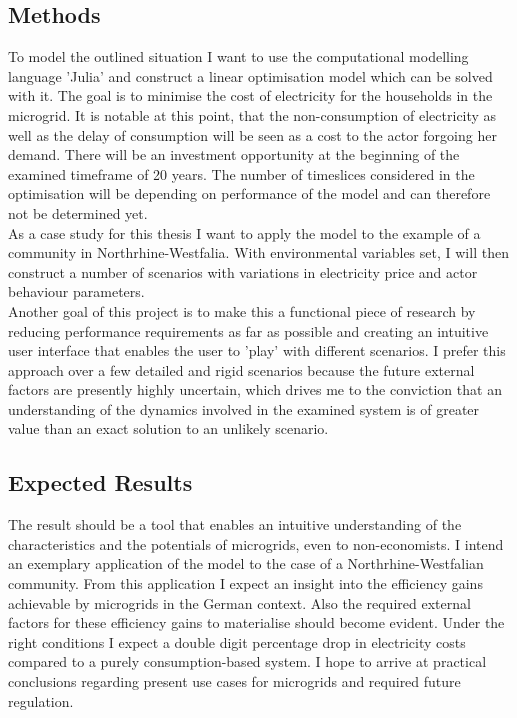 \documentclass[
	11pt,								%
	DIV10,								%
	a4paper,         					%
	oneside,							%
	headheight=20pt,					%
	footheight=20pt,					%
    parskip=full,						%
    listof=totoc,						%
	bibliography=totoc,					%
	index=totoc,						%
]{scrartcl}
\begin{document}
\subsection{Methods}
	To model the outlined situation I want to use the computational modelling language 'Julia' and construct a linear optimisation model which can be solved with it. The goal is to minimise the cost of electricity for the households in the microgrid. It is notable at this point, that the non-consumption of electricity as well as the delay of consumption will be seen as a cost to the actor forgoing her demand. There will be an investment opportunity at the beginning of the examined timeframe of 20 years. The number of timeslices considered in the optimisation will be depending on performance of the model and can therefore not be determined yet. \\
	As a case study for this thesis I want to apply the model to the example of a community in Northrhine-Westfalia. With environmental variables set, I will then construct a number of scenarios with variations in electricity price and actor behaviour parameters. \\
	Another goal of this project is to make this a functional piece of research by reducing performance requirements as far as possible and creating an intuitive user interface that enables the user to 'play' with different scenarios. I prefer this approach over a few detailed and rigid scenarios because the future external factors are presently highly uncertain, which drives me to the conviction that an understanding of the dynamics involved in the examined system is of greater value than an exact solution to an unlikely scenario.

	
\subsection{Expected Results}
The result should be a tool that enables an intuitive understanding of the characteristics and the potentials of microgrids, even to non-economists. I intend an exemplary application of the model to the case of a Northrhine-Westfalian community. From this application I expect an insight into the efficiency gains achievable by microgrids in the German context. Also the required external factors for these efficiency gains to materialise should become evident. Under the right conditions I expect a double digit percentage drop in electricity costs compared to a purely consumption-based system. I hope to arrive at practical conclusions regarding present use cases for microgrids and required future regulation.
\end{document}
